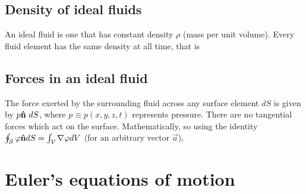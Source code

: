\documentclass[12pt]{book}
\begin{document}
\subsection{Density of ideal fluids}
An ideal fluid is one that has constant density $\rho$ (mass per unit volume).  Every fluid element has the same density at all time, that is

\subsection{Forces in an ideal fluid}
The force exerted by the surrounding fluid across any surface element $dS$ is given by $p\boldsymbol{\hat{\textbf{n}}}\ dS$, where $p\equiv p(x,y,z,t)$ represents pressure.  There are no tangential forces which act on the surface. Mathematically, 
so using the identity $\oint_{\mathcal S} \vec \varphi \nhat dS = \int_{\mathcal V}\Nabla\vec \varphi dV$  (for an arbitrary vector $\vec a$),  


\section{Euler's equations of motion}
\end{document}
